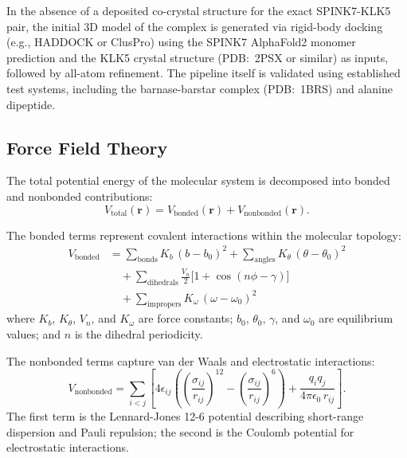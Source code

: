 \documentclass[conference]{IEEEtran}
\begin{document}
In the absence of a deposited co-crystal structure for the exact SPINK7-KLK5
pair, the initial 3D model of the complex is generated via rigid-body docking
(e.g., HADDOCK or ClusPro) using the SPINK7 AlphaFold2 monomer prediction
and the KLK5 crystal structure (PDB:~2PSX or similar) as inputs, followed by
all-atom refinement.  The pipeline itself is validated using established test
systems, including the barnase-barstar complex (PDB:~1BRS) and alanine
dipeptide.

\subsection{Force Field Theory}\label{sec:force_field}

The total potential energy of the molecular system is decomposed into bonded
and nonbonded contributions:
\begin{equation}\label{eq:Vtotal}
  V_{\mathrm{total}}(\mathbf{r})
  = V_{\mathrm{bonded}}(\mathbf{r}) + V_{\mathrm{nonbonded}}(\mathbf{r}).
\end{equation}

The bonded terms represent covalent interactions within the molecular
topology:
\begin{equation}\label{eq:Vbonded}
\begin{split}
  V_{\mathrm{bonded}} &= \sum_{\mathrm{bonds}} K_b\,(b - b_0)^2
    + \sum_{\mathrm{angles}} K_\theta\,(\theta - \theta_0)^2 \\
  &\quad + \sum_{\mathrm{dihedrals}} \frac{V_n}{2}
    \bigl[1 + \cos(n\phi - \gamma)\bigr] \\
  &\quad + \sum_{\mathrm{impropers}} K_\omega\,(\omega - \omega_0)^2
\end{split}
\end{equation}
where $K_b$, $K_\theta$, $V_n$, and $K_\omega$ are force constants;
$b_0$, $\theta_0$, $\gamma$, and $\omega_0$ are equilibrium values; and
$n$ is the dihedral periodicity.

The nonbonded terms capture van der Waals and electrostatic interactions:
\begin{equation}\label{eq:Vnonbonded}
  V_{\mathrm{nonbonded}} = \sum_{i < j} \left[
    4\epsilon_{ij} \!\left(
      \!\left(\frac{\sigma_{ij}}{r_{ij}}\right)^{\!12}
      - \left(\frac{\sigma_{ij}}{r_{ij}}\right)^{\!6}
    \right)
    + \frac{q_i q_j}{4\pi\epsilon_0\,r_{ij}}
  \right].
\end{equation}
The first term is the Lennard-Jones 12-6 potential describing short-range
dispersion and Pauli repulsion; the second is the Coulomb potential for
electrostatic interactions.
\end{document}
